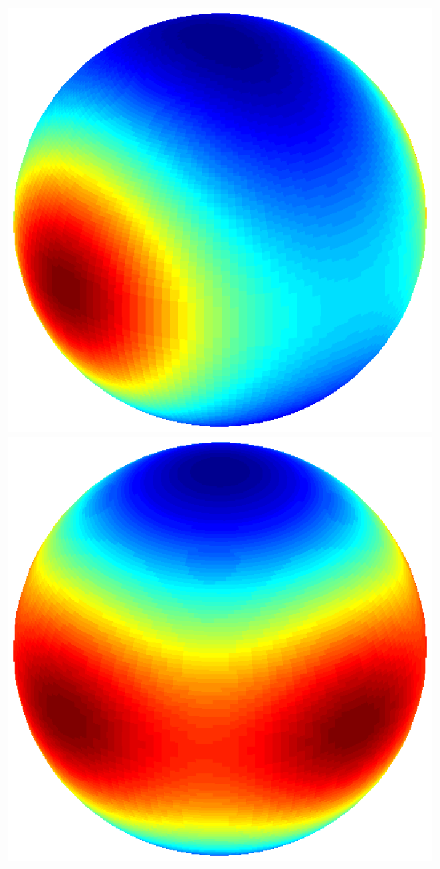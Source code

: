 \documentclass[dvips,aoas,preprint]{imsart}
\numberwithin{equation}{section}
\theoremstyle{plain}
\begin{document}
\begin{figure}[!htbp]
\begin{minipage}[]{0.12\textwidth}
    \end{minipage}
    \begin{minipage}[]{0.12\textwidth}
      \centering
      \includegraphics*[width=\textwidth]{figure3b1.eps}
    \end{minipage}
    \begin{minipage}[]{0.12\textwidth}
      \centering
      \includegraphics*[width=\textwidth]{figure3c1.eps}

\end{minipage}
\end{figure}
\end{document}
